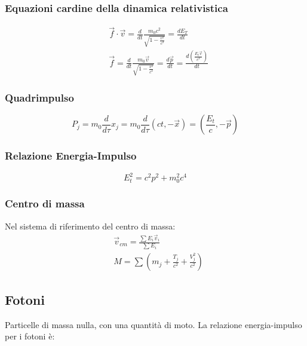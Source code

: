\documentclass{article}
\begin{document}
\subsubsection{Equazioni cardine della dinamica relativistica}

\begin{equation}
    \begin{aligned}
   & \vec{f}\cdot\vec{v}=\frac{d}{dt}\frac{m_0c^2}{\sqrt{1-\frac{v^2}{c^2}}}= \frac{d E_T}{dt} \\
    & \vec{f}=\frac{d}{dt}\frac{m_0\vec{v}}{\sqrt{1-\frac{v^2}{c^2}}}=\frac{d \vec{p}}{dt}=\frac{d (\frac{E_t\vec{v}}{c^2})}{dt}
     \end{aligned}
\end{equation}

\subsubsection{Quadrimpulso}

\begin{equation}
    P_j=m_0\frac{d}{d\tau}x_j=m_0\frac{d}{d\tau}(ct,-\vec{x})=(\frac{E_t}{c},-\vec{p})
\end{equation}

\subsubsection{Relazione Energia-Impulso}

\begin{equation}
    E_t^2=c^2p^2+m_0^2c^4
\end{equation}

\subsubsection*{Centro di massa}
Nel sistema di riferimento del centro di massa:
\begin{equation}
    \begin{aligned}
        & \vec{v}_{cm}=\frac{\sum E_i\vec{v}_i}{\sum E_i} \\
        & M= \sum(m_j+\frac{T_j}{c^2}+\frac{V_j^2}{c^2})
    \end{aligned}
\end{equation}

\subsection{Fotoni}
Particelle di massa nulla, con una quantità di moto.
La relazione energia-impulso per i fotoni è:
\end{document}
